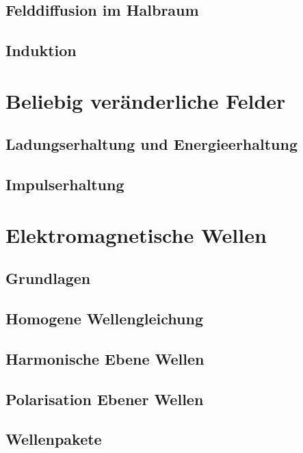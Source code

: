 \subsection{Felddiffusion im Halbraum}

\subsection{Induktion}

\section{Beliebig veränderliche Felder}
\subsection{Ladungserhaltung und Energieerhaltung}

\subsection{Impulserhaltung}

\section{Elektromagnetische Wellen}
\subsection{Grundlagen}

\subsection{Homogene Wellengleichung}

\subsection{Harmonische Ebene Wellen}

\subsection{Polarisation Ebener Wellen}

\subsection{Wellenpakete}

